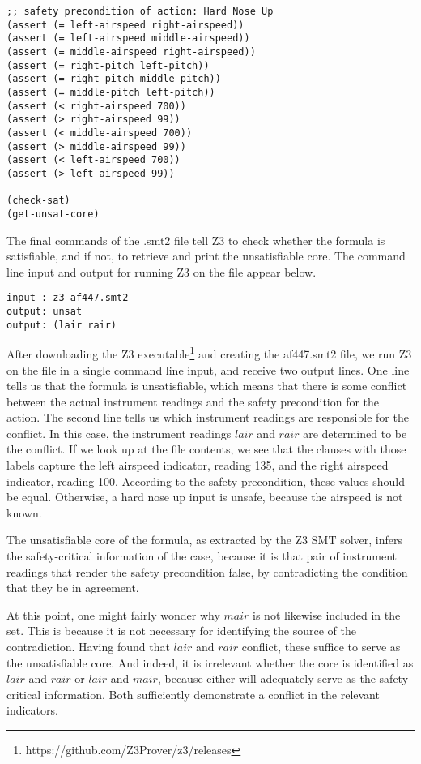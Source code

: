 \begin{tcolorbox}
	\begin{lstlisting}
;; safety precondition of action: Hard Nose Up
(assert (= left-airspeed right-airspeed))
(assert (= left-airspeed middle-airspeed))
(assert (= middle-airspeed right-airspeed))
(assert (= right-pitch left-pitch))
(assert (= right-pitch middle-pitch))
(assert (= middle-pitch left-pitch))
(assert (< right-airspeed 700))
(assert (> right-airspeed 99))
(assert (< middle-airspeed 700))
(assert (> middle-airspeed 99))
(assert (< left-airspeed 700))
(assert (> left-airspeed 99))

(check-sat)
(get-unsat-core)

\end{lstlisting}
\end{tcolorbox}
The final commands of the .smt2 file tell Z3 to check whether the formula is satisfiable, and if not, to retrieve and print the unsatisfiable core. The command line input and output for running Z3 on the file appear below.
\noindent
\begin{tcolorbox}
	\begin{lstlisting}
input : z3 af447.smt2
output: unsat
output: (lair rair)
\end{lstlisting}
\end{tcolorbox}
\noindent
After downloading the Z3 executable\footnote{https://github.com/Z3Prover/z3/releases} and creating the af447.smt2 file, we run Z3 on the file in a single command line input, and receive two output lines. One line tells us that the formula is unsatisfiable, which means that there is some conflict between the actual instrument readings and the safety precondition for the action. The second line tells us which instrument readings are responsible for the conflict. In this case, the instrument readings $lair$ and $rair$ are determined to be the conflict. If we look up at the file contents, we see that the clauses with those labels capture the left airspeed indicator, reading 135, and the right airspeed indicator, reading 100. According to the safety precondition, these values should be equal. Otherwise, a hard nose up input is unsafe, because the airspeed is not known. 

The unsatisfiable core of the formula, as extracted by the Z3 SMT solver, infers the safety-critical information of the case, because it is that pair of instrument readings that render the safety precondition false, by contradicting the condition that they be in agreement.

At this point, one might fairly wonder why $mair$ is not likewise included in the set. This is because it is not necessary for identifying the source of the contradiction. Having found that $lair$ and $rair$ conflict, these suffice to serve as the unsatisfiable core. And indeed, it is irrelevant whether the core is identified as $lair$ and $rair$ or $lair$ and $mair$, because either will adequately serve as the safety critical information. Both sufficiently demonstrate a conflict in the relevant indicators.

